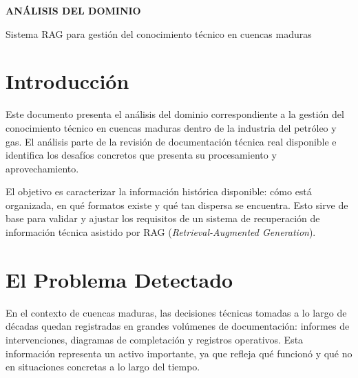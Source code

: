 \documentclass[12pt, a4paper]{article}
\begin{document}
\begin{titlepage}
  \color{primaryblue}
  \vspace*{3cm}
  \begin{center}
    {\fontsize{34}{42}\selectfont\bfseries AN\'{A}LISIS DEL DOMINIO\par}
    \vspace{0.9cm}
    {\Large Sistema RAG para gesti\'{o}n del conocimiento t\'{e}cnico en cuencas maduras\par}
    \vspace{1.4cm}
  \end{center}
\end{titlepage}

\tableofcontents
\newpage

\section{Introducci\'{o}n}

Este documento presenta el an\'{a}lisis del dominio correspondiente a la gesti\'{o}n del
conocimiento t\'{e}cnico en cuencas maduras dentro de la industria del petr\'{o}leo y gas.
El an\'{a}lisis parte de la revisi\'{o}n de documentaci\'{o}n t\'{e}cnica real disponible e
identifica los desaf\'{i}os concretos que presenta su procesamiento y aprovechamiento.

El objetivo es caracterizar la informaci\'{o}n hist\'{o}rica disponible: c\'{o}mo est\'{a}
organizada, en qu\'{e} formatos existe y qu\'{e} tan dispersa se encuentra. Esto sirve de base
para validar y ajustar los requisitos de un sistema de recuperaci\'{o}n de informaci\'{o}n
t\'{e}cnica asistido por RAG (\textit{Retrieval-Augmented Generation}).

\section{El Problema Detectado}

En el contexto de cuencas maduras, las decisiones t\'{e}cnicas tomadas a lo largo de
d\'{e}cadas quedan registradas en grandes vol\'{u}menes de documentaci\'{o}n: informes de
intervenciones, diagramas de completaci\'{o}n y registros operativos. Esta informaci\'{o}n
representa un activo importante, ya que refleja qu\'{e} funcion\'{o} y qu\'{e} no en
situaciones concretas a lo largo del tiempo.
\end{document}
